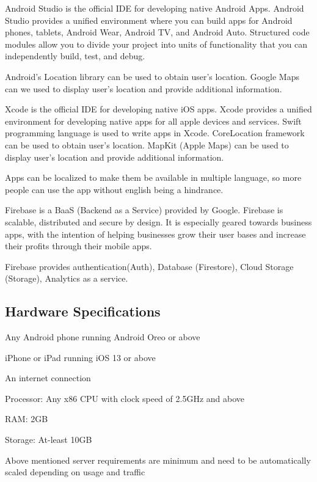 \documentclass[../Report.tex]{subfiles}
\begin{document}
\begin{description}
  \item[Android Studio: ] Android Studio is the official IDE for developing native Android Apps. Android Studio provides a unified  
  environment where you can build apps for Android phones, tablets, Android Wear, Android TV, and Android Auto. Structured code modules 
  allow you to  divide your project into units of functionality that you can independently build, test, and debug.\par
  Android's Location library can be used to obtain user's location. Google Maps can we used to display user's location and provide 
  additional information.

  \item[Xcode: ] Xcode is the official IDE for developing native iOS apps. Xcode provides a unified environment for developing native apps 
  for all apple devices and services. Swift programming language is used to write apps in Xcode. CoreLocation framework can be used to 
  obtain user's location. MapKit (Apple Maps) can be used to display user's location and provide additional information.\par

  \item Apps can be localized to make them be available in multiple language, so more people can use the app without english being a 
  hindrance.

  \item[Firebase: ] Firebase is a BaaS (Backend as a Service) provided by Google. Firebase is scalable, distributed and secure by design. It is especially
  geared towards business apps, with the intention of helping businesses grow their user bases and increase their profits through their mobile apps.\par
  Firebase provides authentication(Auth), Database (Firestore), Cloud Storage (Storage), Analytics as a service.
\end{description}

\subsection{Hardware Specifications}
\begin{description}
  \item[User Device Requirements: ]
  \item Any Android phone running Android Oreo or above
  \item iPhone or iPad running iOS 13 or above
  \item An internet connection
  \item 
  
  \item [Minimum Server Requirements: ]
  \item Processor: Any x86 CPU with clock speed of 2.5GHz and above
  \item RAM: 2GB
  \item Storage: At-least 10GB
\end{description}
Above mentioned server requirements are minimum and need to be automatically scaled depending on usage and traffic
\end{document}
